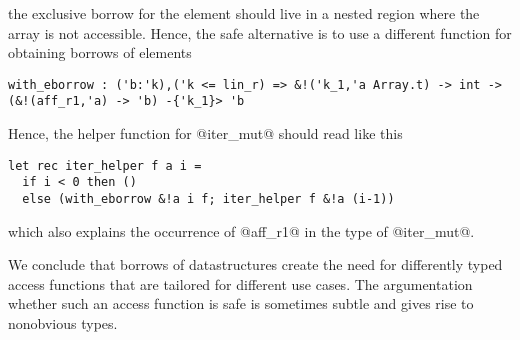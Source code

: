 the exclusive borrow for the element should live in a nested region
where the array is not accessible. Hence, the safe alternative is
to use a different function for obtaining borrows of elements
\begin{lstlisting}[numbers=none]
with_eborrow : ('b:'k),('k <= lin_r) => &!('k_1,'a Array.t) -> int -> (&!(aff_r1,'a) -> 'b) -{'k_1}> 'b
\end{lstlisting}
Hence, the helper function for @iter_mut@ should read like this
\begin{lstlisting}
let rec iter_helper f a i =
  if i < 0 then ()
  else (with_eborrow &!a i f; iter_helper f &!a (i-1))
\end{lstlisting}
which also explains the occurrence of @aff_r1@ in the type of
@iter_mut@.

We conclude that borrows of datastructures create the need for
differently typed access functions that are tailored for different use
cases. The argumentation whether such an access function is safe is
sometimes subtle and gives rise to nonobvious types.

\lstDeleteShortInline@

